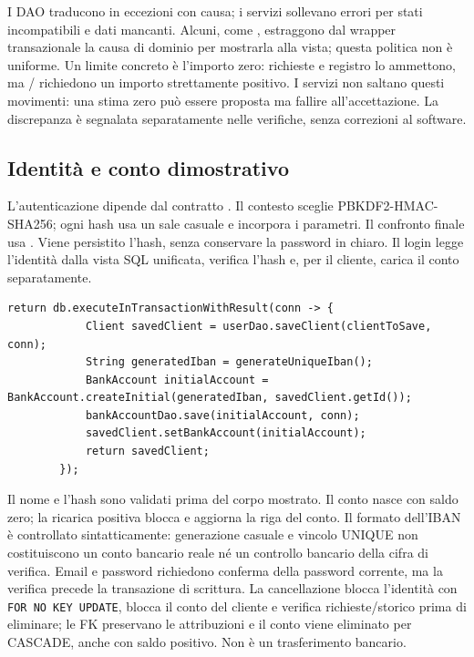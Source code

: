 I DAO traducono  in eccezioni con causa; i servizi
sollevano errori per stati incompatibili e dati mancanti. Alcuni, come
, estraggono dal wrapper transazionale la causa di
dominio per mostrarla alla vista; questa politica non è uniforme.
Un limite concreto è l'importo zero: richieste e registro lo ammettono,
ma / richiedono un importo
strettamente positivo. I servizi non saltano questi movimenti: una stima
zero può essere proposta ma fallire all'accettazione. La discrepanza è
segnalata separatamente nelle verifiche, senza correzioni al software.

\subsection{Identità e conto dimostrativo}
L'autenticazione dipende dal contratto .
Il contesto sceglie PBKDF2-HMAC-SHA256; ogni hash usa un sale casuale
e incorpora i parametri. Il confronto finale usa .
Viene persistito l'hash, senza conservare la password in chiaro.
Il login legge l'identità dalla vista SQL unificata, verifica l'hash e,
per il cliente, carica il conto separatamente.

\noindent\begin{minipage}{\linewidth}
\begin{lstlisting}[firstnumber=57,caption={\code{AuthService.java}: registrazione del cliente e conto iniziale nella stessa transazione.},
  label=lst:registrazione]
        return db.executeInTransactionWithResult(conn -> {
            Client savedClient = userDao.saveClient(clientToSave, conn);
            String generatedIban = generateUniqueIban();
            BankAccount initialAccount = BankAccount.createInitial(generatedIban, savedClient.getId());
            bankAccountDao.save(initialAccount, conn);
            savedClient.setBankAccount(initialAccount);
            return savedClient;
        });
\end{lstlisting}
\end{minipage}


Il nome e l'hash sono validati prima del corpo mostrato. Il conto nasce
con saldo zero; la ricarica positiva blocca e aggiorna la riga del conto.
Il formato dell'IBAN è controllato sintatticamente: generazione casuale
e vincolo UNIQUE non costituiscono un conto bancario reale né un controllo
bancario della cifra di verifica. Email e password richiedono conferma
della password corrente, ma la verifica precede la transazione di scrittura.
La cancellazione blocca l'identità con \texttt{FOR NO KEY UPDATE}, blocca
il conto del cliente e verifica richieste/storico prima di eliminare;
le FK preservano le attribuzioni e il conto viene eliminato per CASCADE,
anche con saldo positivo. Non è un trasferimento bancario.

